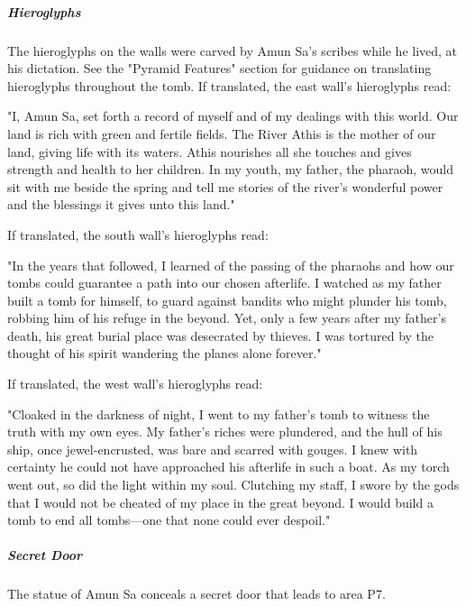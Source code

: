 \documentclass[10pt,a4paper,twoside,bg=print,twocolumn,openany,nodeprecatedcode]{dndbook}
\begin{document}
\subparagraph{Hieroglyphs}
The hieroglyphs on the walls were carved by Amun Sa's scribes while he lived, at his dictation. See the "Pyramid Features" section for guidance on translating hieroglyphs throughout the tomb. If translated, the east wall's hieroglyphs read:

\begin{DndReadAloud}{}
"I, Amun Sa, set forth a record of myself and of my dealings with this world. Our land is rich with green and fertile fields. The River Athis is the mother of our land, giving life with its waters. Athis nourishes all she touches and gives strength and health to her children. In my youth, my father, the pharaoh, would sit with me beside the spring and tell me stories of the river's wonderful power and the blessings it gives unto this land."

\end{DndReadAloud}

If translated, the south wall's hieroglyphs read:

\begin{DndReadAloud}{}
"In the years that followed, I learned of the passing of the pharaohs and how our tombs could guarantee a path into our chosen afterlife. I watched as my father built a tomb for himself, to guard against bandits who might plunder his tomb, robbing him of his refuge in the beyond. Yet, only a few years after my father's death, his great burial place was desecrated by thieves. I was tortured by the thought of his spirit wandering the planes alone forever."

\end{DndReadAloud}

If translated, the west wall's hieroglyphs read:

\begin{DndReadAloud}{}
"Cloaked in the darkness of night, I went to my father's tomb to witness the truth with my own eyes. My father's riches were plundered, and the hull of his ship, once jewel-encrusted, was bare and scarred with gouges. I knew with certainty he could not have approached his afterlife in such a boat. As my torch went out, so did the light within my soul. Clutching my staff, I swore by the gods that I would not be cheated of my place in the great beyond. I would build a tomb to end all tombs—one that none could ever despoil."

\end{DndReadAloud}

\subparagraph{Secret Door}
The statue of Amun Sa conceals a secret door that leads to area P7.
\end{document}
